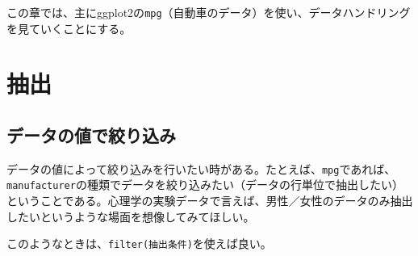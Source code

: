 \documentclass[]{book}
\newenvironment{Shaded}{\begin{snugshade}}{\end{snugshade}}
\newcommand{\KeywordTok}[1]{\textcolor[rgb]{0.13,0.29,0.53}{\textbf{#1}}}
\newcommand{\StringTok}[1]{\textcolor[rgb]{0.31,0.60,0.02}{#1}}
\newcommand{\CommentTok}[1]{\textcolor[rgb]{0.56,0.35,0.01}{\textit{#1}}}
\newcommand{\OperatorTok}[1]{\textcolor[rgb]{0.81,0.36,0.00}{\textbf{#1}}}
\newcommand{\NormalTok}[1]{#1}
\begin{document}
この章では、主にggplot2の\texttt{mpg}（自動車のデータ）を使い、データハンドリングを見ていくことにする。

\section{抽出}

\subsection{データの値で絞り込み}

データの値によって絞り込みを行いたい時がある。たとえば、\texttt{mpg}であれば、\texttt{manufacturer}の種類でデータを絞り込みたい（データの行単位で抽出したい）ということである。心理学の実験データで言えば、男性／女性のデータのみ抽出したいというような場面を想像してみてほしい。

このようなときは、\texttt{filter(抽出条件)}を使えば良い。

\begin{Shaded}
\end{Shaded}
\end{document}
